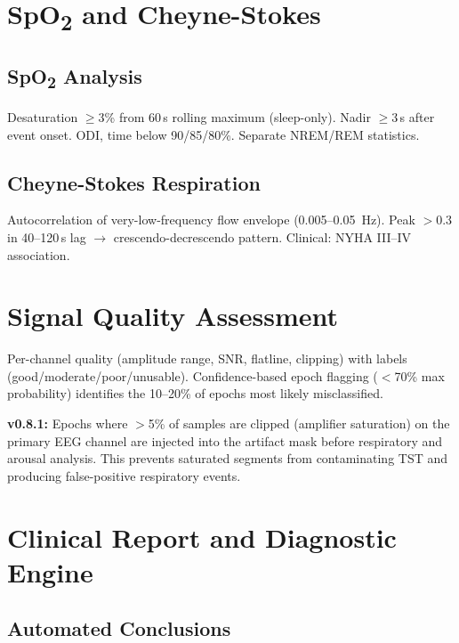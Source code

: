 \documentclass[11pt,a4paper,twocolumn]{article}
\begin{document}
\section{SpO\textsubscript{2} and Cheyne-Stokes}

\subsection{SpO\textsubscript{2} Analysis}
Desaturation $\geq$3\% from 60\,s rolling maximum (sleep-only). Nadir $\geq$3\,s after event onset. ODI, time below 90/85/80\%. Separate NREM/REM statistics.

\subsection{Cheyne-Stokes Respiration}
Autocorrelation of very-low-frequency flow envelope (0.005--0.05~Hz). Peak $> 0.3$ in 40--120\,s lag $\to$ crescendo-decrescendo pattern. Clinical: NYHA III--IV association.


\section{Signal Quality Assessment}

Per-channel quality (amplitude range, SNR, flatline, clipping) with labels (good/moderate/poor/unusable). Confidence-based epoch flagging ($<$70\% max probability) identifies the 10--20\% of epochs most likely misclassified.

\textbf{v0.8.1:} Epochs where $>$5\% of samples are clipped (amplifier saturation) on the primary EEG channel are injected into the artifact mask before respiratory and arousal analysis. This prevents saturated segments from contaminating TST and producing false-positive respiratory events.


\section{Clinical Report and Diagnostic Engine}

\subsection{Automated Conclusions}
\end{document}
